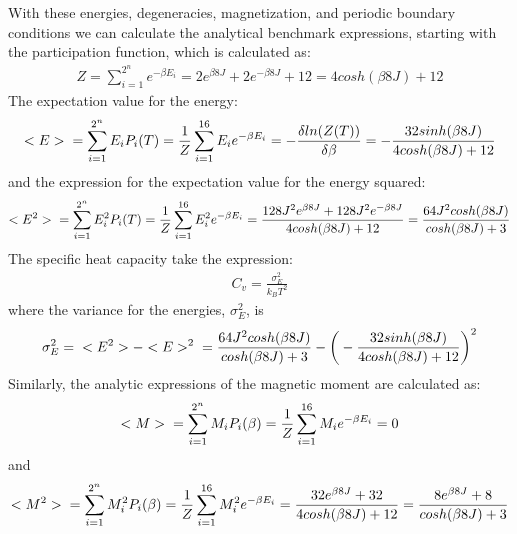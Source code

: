\documentclass[12pt,english,a4paper]{article}
\begin{document}
With these energies, degeneracies, magnetization, and periodic boundary conditions we can calculate the analytical benchmark expressions, starting with the participation function, which is calculated as: 
\begin{align*}
    Z = \sum_{i=1}^{2^n} e^{-\beta E_i}
      = 2e^{\beta 8J} + 2e^{-\beta 8J} + 12
      = 4cosh(\beta 8J) + 12
\end{align*}
The expectation value for the energy:
\begin{align*}
    <E> \hspace{0.2cm} 
        = \sum_{i=1}^{2^n} E_iP_i(T) 
        = \frac{1}{Z} \sum_{i=1}^{16} E_ie^{-\beta E_i}
        = - \frac{\delta ln(Z(T))}{\delta \beta}
        = -\frac{32sinh(\beta 8J)}{4cosh(\beta 8J) + 12}
\end{align*}
and the expression for the expectation value for the energy squared:
\begin{align*}
    <E^2> \hspace{0.2cm} 
          = \sum_{i=1}^{2^n} E_i^2P_i(T) 
          = \frac{1}{Z} \sum_{i=1}^{16} E_i^2e^{-\beta E_i}
          = \frac{128J^2e^{\beta 8J} + 128J^2e^{-\beta 8J}}
                 {4cosh(\beta 8J) + 12}
          = \frac{64J^2cosh(\beta 8J)}{cosh(\beta 8J) + 3}
\end{align*}
The specific heat capacity take the expression:
\begin{align*}
    C_v = \frac{\sigma_E^2}{k_BT^2} 
\end{align*}
where the variance for the energies, $\sigma_E^2$, is
\begin{align*}
    \sigma_E^2 = \hspace{0.2cm} <E^2> - <E>^2 \hspace{0.2cm}
               = \frac{64J^2cosh(\beta 8J)}{cosh(\beta 8J) + 3}
               - \bigg(-\frac{32sinh(\beta 8J)}{4cosh(\beta 8J) + 12}\bigg)^2
\end{align*}
Similarly, the analytic expressions of the magnetic moment are calculated as:
\begin{align*}
    <M> \hspace{0.2cm} 
        = \sum_{i=1}^{2^n} M_iP_i(\beta) 
        = \frac{1}{Z} \sum_{i=1}^{16} M_ie^{-\beta E_i} = 0 
\end{align*}
and
\begin{align*}
    <M^2> \hspace{0.2cm} 
          = \sum_{i=1}^{2^n} M_i^2P_i(\beta) 
          = \frac{1}{Z} \sum_{i=1}^{16} M_i^2e^{-\beta E_i}
          = \frac{32e^{\beta 8J} + 32}
                 {4cosh(\beta 8J) + 12}
          = \frac{8e^{\beta 8J} + 8}{cosh(\beta 8J) + 3}
\end{align*}
\end{document}
